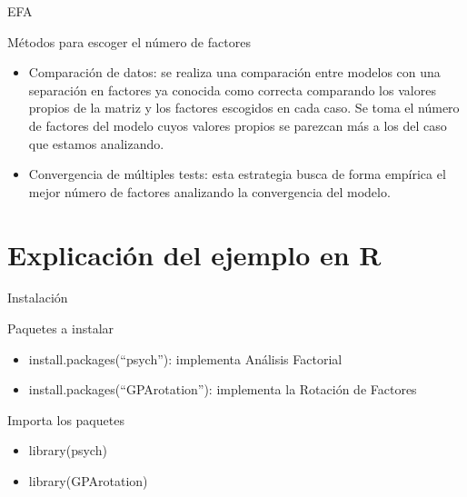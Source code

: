 \documentclass[10pt]{beamer}
\begin{document}
\begin{frame}[fragile]{EFA}
\vspace{10px}
\pause
{}
\begin{block}{Métodos para escoger el número de factores}
	\begin{itemize}
		\item Comparación de datos: se realiza una comparación entre modelos con una separación en factores ya conocida como correcta comparando los valores propios de la matriz y los factores escogidos en cada caso. Se toma el número de factores del modelo cuyos valores propios se parezcan más a los del caso que estamos analizando.
		\item Convergencia de múltiples tests: esta estrategia busca de forma empírica el mejor número de factores analizando la convergencia del modelo.
	\end{itemize}
\end{block}
\end{frame}


\section{Explicación del ejemplo en R}

\begin{frame}[fragile]{Instalación}
	\vspace{10px}
	\pause
	\begin{block}{Paquetes a instalar}
		\begin{itemize}
			\item install.packages(``psych''): implementa Análisis Factorial
			\pause
			\item install.packages(``GPArotation''): implementa la Rotación de Factores
			\pause
		\end{itemize}
	\end{block}
	\vspace{10px}
	\pause
	\begin{alertblock}{Importa los paquetes}
		\begin{itemize}
			\item library(psych)
			\pause
			\item library(GPArotation)
			\pause
		\end{itemize}
	\end{alertblock}
\end{frame}
\end{document}
